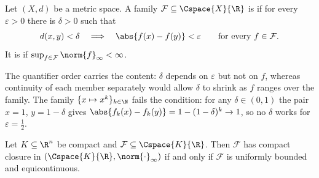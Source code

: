 \begin{definition}[Equicontinuity]\label{def:equicontinuous}
	Let $(X,d)$ be a metric space. A family $\mathcal{F}\subseteq\Cspace{X}{\R}$ is
	 if for every $\varepsilon>0$ there is $\delta>0$ such that
	\[
		d(x,y)<\delta\quad\Longrightarrow\quad\abs{f(x)-f(y)}<\varepsilon
		\qquad\text{for every }f\in\mathcal{F}.
	\]
	It is  if
	$\sup_{f\in\mathcal{F}}\norm{f}_\infty<\infty$.
\end{definition}

The quantifier order carries the content: $\delta$ depends on $\varepsilon$ but
not on $f$, whereas continuity of each member separately would allow $\delta$ to
shrink as $f$ ranges over the family. The family $\{x\mapsto x^{k}\}_{k\in\N}$
fails the condition: for any $\delta\in(0,1)$ the pair $x=1$, $y=1-\delta$ gives
$\abs{f_k(x)-f_k(y)}=1-(1-\delta)^{k}\to1$, so no $\delta$ works for
$\varepsilon=\tfrac12$.

\begin{theorem}\label{thm:arzela-ascoli}
	Let $K\subseteq\R^n$ be compact and $\mathcal{F}\subseteq\Cspace{K}{\R}$. Then
	$\mathcal{F}$ has compact closure in $(\Cspace{K}{\R},\norm{\cdot}_\infty)$ if
	and only if $\mathcal{F}$ is uniformly bounded and equicontinuous.
\end{theorem}

